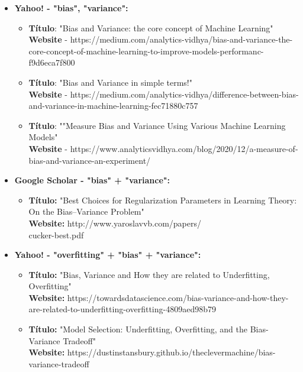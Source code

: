 \documentclass{article}
\begin{document}
\begin{itemize}
        \item \textbf{Yahoo! - "bias", "variance":}
            \begin{itemize}
                \item \textbf{Título}: "Bias and Variance: the core concept of Machine Learning"
                \\ \textbf{Website} - https://medium.com/analytics-vidhya/bias-and-variance-the-core-concept-of-machine-learning-to-improve-models-performanc-f9d6eca7f800

                \item \textbf{Título}: "Bias and Variance in simple terms!"
                \\ \textbf{Website} - https://medium.com/analytics-vidhya/difference-between-bias-and-variance-in-machine-learning-fec71880c757

                \item \textbf{Título}: ""Measure Bias and Variance Using Various Machine Learning Models"
                \\ \textbf{Website} - https://www.analyticsvidhya.com/blog/2020/12/a-measure-of-bias-and-variance-an-experiment/
            \end{itemize}

        \item \textbf{Google Scholar - "bias" + "variance":}
            \begin{itemize}

                \item \textbf{Título: }"Best Choices for Regularization Parameters in Learning Theory: On the Bias–Variance Problem" 
                \\\textbf{Website: } http://www.yaroslavvb.com/papers/\\cucker-best.pdf
            \end{itemize}
            
        \item \textbf{Yahoo! - "overfitting" + "bias" + "variance":}
            \begin{itemize}
                \item \textbf{Título: }"Bias, Variance and How they are related to Underfitting, Overfitting"  \\\textbf{Website: } https://towardsdatascience.com/bias-variance-and-how-they-are-related-to-underfitting-overfitting-4809aed98b79
                
                \item \textbf{Título: }"Model Selection: Underfitting, Overfitting, and the Bias-Variance Tradeoff" 
                \\\textbf{Website: }https://dustinstansbury.github.io/theclevermachine/bias-variance-tradeoff
            \end{itemize}


\end{itemize}
\end{document}
